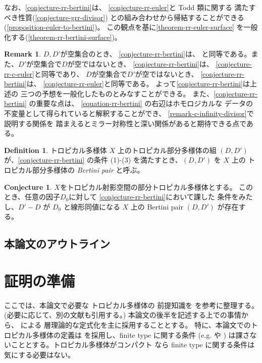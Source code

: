 \documentclass[a4paper,dvipdfmx,reqno,12pt]{amsart}
\theoremstyle{definition}
\newtheorem{definition}[theorem]{Definition}
\newtheorem{conjecture}[theorem]{Conjecture}
\newtheorem{remark}[theorem]{Remark}
\numberwithin{equation}{section}
\begin{document}
なお、\cref{conjecture-rr-bertini}は、
\cref{conjecture-rr-euler}と Todd 類に関する
満たすべき性質(\cref{conjecture-grr-divisor})
との組み合わせから帰結することができる
(\cref{proposition-euler-to-bertini})。
この観点を基に\cref{theorem-rr-euler-surface}
を一般化する(\cref{theorem-rr-bertini-surface})。
\begin{remark}
$D,D'$が空集合のとき、
\cref{conjecture-rr-bertini}は、
\cite[Conjecture 6.13]{demedrano2023chern}
と同等である。また、$D'$が空集合で$D$が空ではないとき、
\cref{conjecture-rr-bertini}は、
\cref{conjecture-rr-c-euler}と同等であり、
$D$が空集合で$D'$が空ではないとき、
\cref{conjecture-rr-bertini}は、
\cref{conjecture-rr-euler}と同等である。
よって\cref{conjecture-rr-bertini}は上述の
三つの予想を一般化したものとみなすことができる。
また、\cref{conjecture-rr-bertini} の重要な点は、
\eqref{equation-rr-bertini} の右辺はホモロジカルな
データの不変量として得られていると解釈することができ、
\cref{remark-c-infinity-divisor}で説明する関係を
踏まえるとミラー対称性と深い関係があると期待できる点である。
\end{remark}

\begin{definition}
トロピカル多様体 $X$ 上のトロピカル部分多様体の組
$(D,D')$ が、\cref{conjecture-rr-bertini} の条件
(1)-(3) を満たすとき、$(D,D')$ を $X$ 上の
トロピカル部分多様体の
\emph{Bertini pair} と呼ぶ。
\end{definition}

\begin{conjecture}
$X$をトロピカル射影空間の部分トロピカル多様体とする。
このとき、任意の因子$D_0$に対して
\cref{conjecture-rr-bertini}において課した
条件をみたし、$D'-D$ が $D_0$ と線形同値になる
$X$ 上の Bertini pair $(D,D')$ が存在する。
\end{conjecture}

\subsection{本論文のアウトライン}



\section{証明の準備}

ここでは、本論文で必要な
トロピカル多様体の
前提知識を
\cite{mikhalkin2018tropical,MR4637248,demedrano2023chern}
を参考に整理する。
(必要に応じて、別の文献も引用する。)
本論文の後半を記述する上での事情から、
\cite{MR4637248}による
層理論的な定式化を主に採用することとする。
特に、本論文でのトロピカル多様体の定義は
\cite[Definition 6.1]{gross2019sheaftheoretic}
を採用し、finite type に関する条件
(e.g. \cite[Definition 7.1.14]{mikhalkin2018tropical} や
\cite[Definition 2.3 (4)]{demedrano2023chern})
は課さないこととする。トロピカル多様体がコンパクト
なら finite type に関する条件は気にする必要はない。
\end{document}
